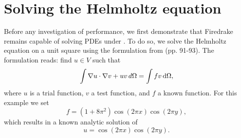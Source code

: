 \documentclass[thesis]{subfiles}
\begin{document}
%

\section{Solving the Helmholtz equation}

Before any investigation of performance, we first demonstrate that Firedrake remains capable of solving PDEs under .
To do so, we solve the Helmholtz equation on a unit square using the formulation from \cite{FiredrakeUserManual} (pp. 91-93).
The formulation reads: find $u \in V$ such that
\begin{equation}
  \int \nabla u \cdot \nabla v + uv \textnormal \, {d}\Omega = \int fv\, \textnormal{d}\Omega,
\end{equation}
where $u$ is a trial function, $v$ a test function, and $f$ a known function.
For this example we set
\begin{equation}
  f = (1 + 8 \pi^2)\cos (2\pi x)\cos(2\pi y),
\end{equation}
which results in a known analytic solution of
\begin{equation}
  u = \cos(2\pi x) \cos(2\pi y).
\end{equation}
\end{document}
